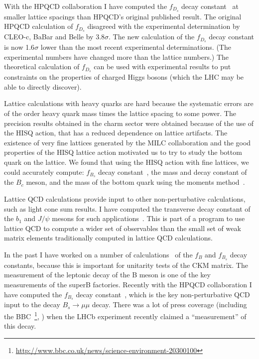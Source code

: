 With the HPQCD collaboration I have computed 
the $f_{D_s}$ decay
constant~\cite{arXiv:1008.4018}
at smaller lattice spacings
than HPQCD's original published result.
The original HPQCD calculation of $f_{D_s}$
disagreed with the experimental determination
by CLEO-c, BaBar and Belle by $3.8\sigma$. 
The new calculation of the $f_{D_s}$ decay
constant is now 1.6$\sigma$ lower than
the most recent experimental determinations.
(The experimental numbers have changed more than the
lattice numbers.)
The theoretical calculation of $f_{D_s}$ can
be used
with experimental results to put constraints 
on the properties of charged Higgs bosons
(which the LHC may be able to directly discover).


Lattice calculations with heavy quarks are hard because
the systematic errors are of the order heavy quark mass times
the lattice spacing to some power. The precision results obtained
in the charm sector were obtained because of the use
of the HISQ action, that has a reduced dependence on
lattice artifacts. The existence of very fine lattices 
generated by the MILC collaboration and the good properties of
the HISQ lattice action motivated us to try to
study the bottom quark on the lattice.
We found that using the HISQ action with fine lattices,
we could accurately compute: 
$f_{B_s}$ decay constant~\cite{McNeile:2011ng}, 
the mass and decay
constant of the $B_c$ meson, and the mass of the bottom quark
using the moments method~\cite{McNeile:2010ji}. 


Lattice QCD calculations provide input to other 
non-perturbative calculations, such as light cone
sum results. I have computed the transverse
decay constant of the $b_1$ and $J/\psi$ mesons
for such applications~\cite{Jansen:2009hr,Jansen:2009yh,Dimopoulos:2008ee}. 
This is part of a program
to use lattice QCD to compute a wider set of 
observables than the small set of weak matrix elements
traditionally computed in lattice QCD calculations.

In the past I have worked on a 
number of 
calculations~\cite{Bernard:2002pc,McNeile:2004wn} of
the $f_{B}$ and $f_{B_s}$ decay constants, 
because this is important for unitarity
tests of the CKM matrix. The measurement of the leptonic decay 
of the B meson is one of the key measurements of the superB factories.
Recently with the HPQCD collaboration I have computed
the $f_{B_s}$ decay constant~\cite{McNeile:2011ng}, 
which is the key non-perturbative QCD 
input to the decay $B_s \rightarrow \mu \mu$ decay.
There was a lot of press coverage 
(including the 
BBC~\footnote{\url{http://www.bbc.co.uk/news/science-environment-20300100}},
)
when the LHCb experiment recently claimed a ``measurement''
of this decay.


